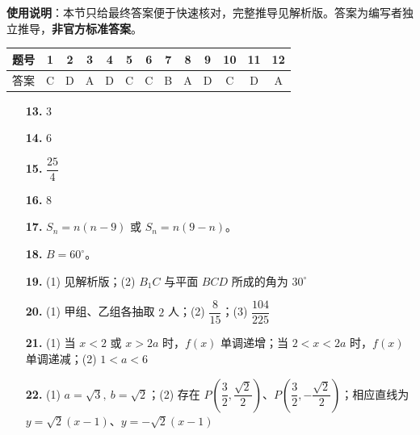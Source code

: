 
\begin{gknotice}
\textbf{使用说明}：本节只给最终答案便于快速核对，完整推导见解析版。答案为编写者独立推导，\textbf{非官方标准答案}。
\end{gknotice}

\begin{center}\begin{tabular}{ccccccccccccc}
\toprule
题号 & 1 & 2 & 3 & 4 & 5 & 6 & 7 & 8 & 9 & 10 & 11 & 12 \\
\midrule
答案 & C & D & A & D & C & C & B & A & D & C & D & A \\
\bottomrule
\end{tabular}\end{center}

\begin{itemize}[leftmargin=2.6em]
  \item[\textbf{13.}] $3$
  \item[\textbf{14.}] $6$
  \item[\textbf{15.}] $\dfrac{25}{4}$
  \item[\textbf{16.}] $8$
\end{itemize}

\begin{itemize}[leftmargin=2.6em]
  \item[\textbf{17.}] $S_n=n(n-9)$ 或 $S_n=n(9-n)$。
  \item[\textbf{18.}] $B=60^\circ$。
  \item[\textbf{19.}] (1) 见解析版；(2) $B_1C$ 与平面 $BCD$ 所成的角为 $30^\circ$
  \item[\textbf{20.}] (1) 甲组、乙组各抽取 $2$ 人；(2) $\dfrac8{15}$；(3) $\dfrac{104}{225}$
  \item[\textbf{21.}] (1) 当 $x<2$ 或 $x>2a$ 时，$f(x)$ 单调递增；当 $2<x<2a$ 时，$f(x)$ 单调递减；(2) $1<a<6$
  \item[\textbf{22.}] (1) $a=\sqrt3,\ b=\sqrt2$；(2) 存在 $P\left(\dfrac32,\dfrac{\sqrt2}{2}\right)$、$P\left(\dfrac32,-\dfrac{\sqrt2}{2}\right)$；相应直线为 $y=\sqrt2(x-1)$、$y=-\sqrt2(x-1)$
\end{itemize}
